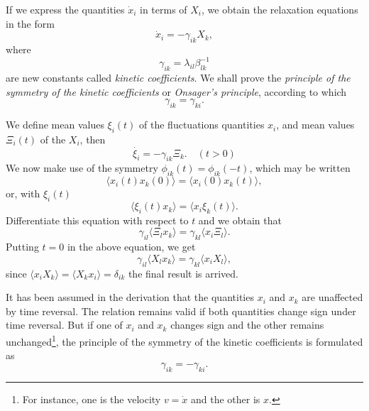\documentclass{book}
\newcommand{\average}[1]{\langle#1\rangle}
\numberwithin{equation}{section}
\begin{document}
If we express the quantities $\dot{x}_i$ in terms of $X_i$, we obtain
the relaxation equations in the form
\begin{equation}
  \dot{x}_i=-\gamma_{ik}X_k,
\end{equation}
where
\begin{equation}
  \gamma_{ik}=\lambda_{il}\beta^{-1}_{lk}
\end{equation}
are new constants called {\it kinetic coefficients}. We shall prove
the {\it principle of the symmetry of the kinetic coefficients} or
{\it Onsager's principle}, according to which 
\begin{equation}
  \gamma_{ik}=\gamma_{ki}.
\end{equation}

We define mean values $\xi_i(t)$ of the fluctuations quantities $x_i$,
and mean values $\varXi_i(t)$ of the $X_i$, then
\begin{equation}
  \dot{\xi_i}=-\gamma_{ik}\varXi_k.\quad (t>0)
\end{equation}
We now make use of the symmetry $\phi_{ik}(t)=\phi_{ik}(-t)$, which
may be written 
\begin{equation}
  \average{x_i(t)x_k(0)}=\average{x_i(0)x_k(t)},
\end{equation}
or, with $\xi_i(t)$
\begin{equation}
  \average{\xi_i(t)x_k}=\average{x_i\xi_k(t)}.
\end{equation}
Differentiate this equation with respect to $t$ and we obtain that
\begin{equation}
  \gamma_{il}\average{\varXi_l x_k}=\gamma_{kl}\average{x_i\varXi_l}.
\end{equation}
Putting $t=0$ in the above equation, we get
\begin{equation}
  \gamma_{il}\average{X_lx_k}=\gamma_{kl}\average{x_iX_l},
\end{equation}
since $\average{x_iX_k}=\average{X_kx_i}=\delta_{ik}$ the final result
is arrived.

It has been assumed in the derivation that the quantities $x_i$ and
$x_k$ are unaffected by time reversal. The relation remains valid if
both quantities change sign under time reversal. But if one of $x_i$
and $x_k$ changes sign and the other remains unchanged\footnote{For instance, 
one is the velocity $v=\dot{x}$ and the other is $x$.}, the principle
of the symmetry of the kinetic coefficients is formulated as
\begin{equation}
  \gamma_{ik}=-\gamma_{ki}.
\end{equation}
\end{document}

